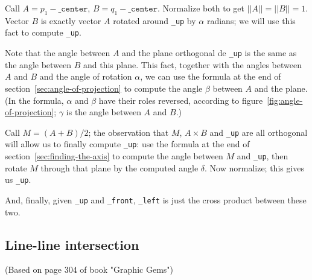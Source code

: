 \documentclass{article}
\newcommand\attribute[1]{\texttt{#1}}
\begin{document}
Call $A = p_1 - \attribute{\_center}$, $B = q_1 - \attribute{\_center}$.
Normalize both to get $||A|| = ||B|| = 1$.
Vector $B$ is exactly vector $A$ rotated around \attribute{\_up}
by $\alpha$ radians;
we will use this fact to compute \attribute{\_up}.

Note that the angle between $A$ and the plane orthogonal de \attribute{\_up}
is the same as the angle between $B$ and this plane.
This fact, together with the angles between $A$ and $B$
and the angle of rotation $\alpha$,
we can use the formula at the end of section~\ref{sec:angle-of-projection}
to compute the angle $\beta$ between $A$ and the plane.
(In the formula, $\alpha$ and $\beta$ have their roles reversed,
according to figure~\ref{fig:angle-of-projection};
$\gamma$ is the angle between $A$ and $B$.)

Call $M = (A + B)/2$; the observation that $M$,
$A \times B$ and \attribute{\_up} are all orthogonal
will allow us to finally compute \attribute{\_up}:
use the formula at the end of section~\ref{sec:finding-the-axis}
to compute the angle between $M$ and \attribute{\_up},
then rotate $M$ through that plane by the computed angle $\delta$.
Now normalize;
this gives us \attribute{\_up}.

And, finally, given \attribute{\_up} and \attribute{\_front},
\attribute{\_left} is just the cross product between these two.

\subsection{Line-line intersection}
\label{sec:line-line-intersection}

(Based on page 304 of book "Graphic Gems")
\end{document}
